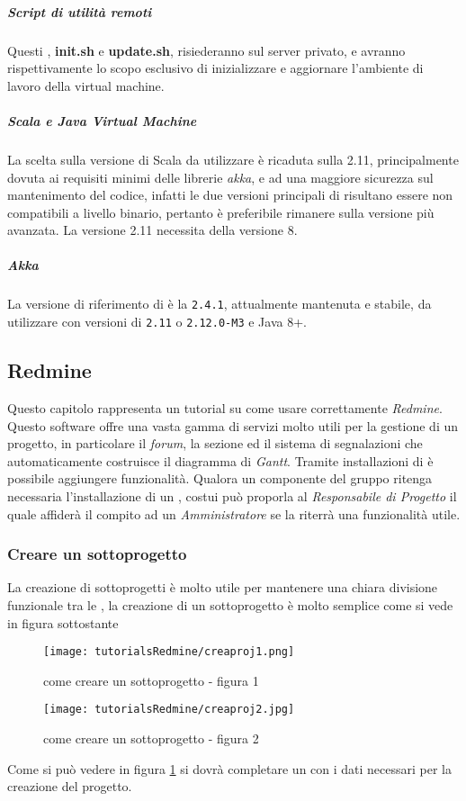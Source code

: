 \documentclass{scalatekids-article}
\begin{document}
\subparagraph{Script di utilità remoti}
Questi , \textbf{init.sh} e \textbf{update.sh}, risiederanno sul server
privato, e avranno rispettivamente lo scopo esclusivo di inizializzare e
aggiornare l'ambiente di lavoro della virtual machine.
\subparagraph{Scala e Java Virtual Machine}
La scelta sulla versione di Scala da utilizzare è ricaduta sulla 
2.11, principalmente dovuta ai requisiti minimi delle librerie \textit{akka}, e
ad una maggiore sicurezza sul mantenimento del codice, infatti le due versioni
principali di  risultano essere non compatibili a livello binario,
pertanto è preferibile rimanere sulla versione più avanzata. La versione 2.11
necessita della  versione 8.
\subparagraph{Akka}
La versione di riferimento di  è la \verb=2.4.1=, attualmente
mantenuta e stabile, da utilizzare con versioni di  \verb=2.11= o
\verb=2.12.0-M3= e Java 8+.
\subsection{Redmine}
Questo capitolo rappresenta un tutorial su come usare correttamente \textit{Redmine}.
Questo software offre una vasta gamma di servizi molto utili per la gestione di un progetto, in particolare il \textit{forum}, la sezione  ed il sistema di segnalazioni che automaticamente costruisce il diagramma di \textit{Gantt}. Tramite installazioni di  è possibile aggiungere funzionalità. Qualora un componente del gruppo ritenga necessaria l'installazione di un , costui può proporla al \textit{Responsabile di Progetto} il quale affiderà il compito ad un \textit{Amministratore} se la riterrà una funzionalità utile.
\subsubsection{Creare un sottoprogetto}
La creazione di sottoprogetti è molto utile per mantenere una chiara divisione funzionale tra le , la creazione di un sottoprogetto è molto semplice come si vede in figura sottostante
\begin{figure}[H]
  \centering
  \texttt{[image: tutorialsRedmine/creaproj1.png]}
  \caption{come creare un sottoprogetto - figura 1}
\end{figure}
\begin{figure}[H]
  \centering
  \texttt{[image: tutorialsRedmine/creaproj2.jpg]}
  \caption{come creare un sottoprogetto - figura 2\label{fig:figura-2}}
\end{figure}
Come si può vedere in figura \ref{fig:figura-2} si dovrà completare un  con i dati necessari per la creazione del progetto.
\end{document}
